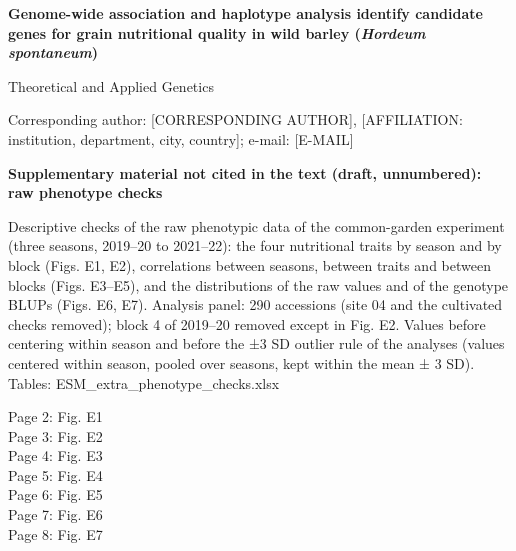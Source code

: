 \documentclass[10pt]{article}
\begin{document}
{\large\bfseries Genome-wide association and haplotype analysis identify candidate genes for grain nutritional quality in wild barley (\textit{Hordeum spontaneum})\par}\vspace{3mm}
Theoretical and Applied Genetics\par
[AUTHOR NAMES]\par
Corresponding author: [CORRESPONDING AUTHOR], [AFFILIATION: institution, department, city, country]; e-mail: [E-MAIL]\par\vspace{10mm}
{\large\bfseries Supplementary material not cited in the text (draft, unnumbered): raw phenotype checks\par}\vspace{3mm}
Descriptive checks of the raw phenotypic data of the common-garden experiment (three seasons, 2019–20 to 2021–22): the four nutritional traits by season and by block (Figs. E1, E2), correlations between seasons, between traits and between blocks (Figs. E3–E5), and the distributions of the raw values and of the genotype BLUPs (Figs. E6, E7). Analysis panel: 290 accessions (site 04 and the cultivated checks removed); block 4 of 2019–20 removed except in Fig. E2. Values before centering within season and before the ±3 SD outlier rule of the analyses (values centered within season, pooled over seasons, kept within the mean ± 3 SD). Tables: ESM\_extra\_phenotype\_checks.xlsx\par\vspace{6mm}
{\small Page 2: Fig. E1\\ Page 3: Fig. E2\\ Page 4: Fig. E3\\ Page 5: Fig. E4\\ Page 6: Fig. E5\\ Page 7: Fig. E6\\ Page 8: Fig. E7}
\end{document}
